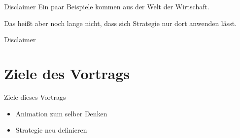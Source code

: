 
\ifonline
\begin{frame}[c]{Disclaimer}
    Ein paar Beispiele kommen aus der Welt der Wirtschaft. \\ \pause

    \vfill

    Das heißt aber noch lange nicht, dass sich Strategie nur dort anwenden lässt.
\end{frame}
\else
\begin{frame}[standout]
    Disclaimer
\end{frame}
\fi


\section{Ziele des Vortrags}
\begin{frame}[c]{Ziele dieses Vortrags}
    \Large
    \begin{itemize}
        \item Animation zum selber Denken
        \item Strategie neu definieren
    \end{itemize}
\end{frame}


